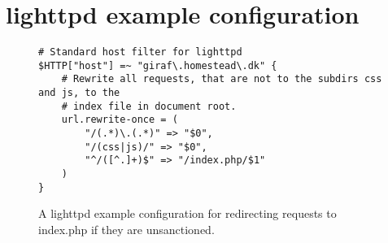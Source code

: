 \chapter{lighttpd example configuration}
\label{appendix_server_conf}
\begin{figure}
\begin{verbatim}
# Standard host filter for lighttpd
$HTTP["host"] =~ "giraf\.homestead\.dk" {
    # Rewrite all requests, that are not to the subdirs css and js, to the
    # index file in document root.
	url.rewrite-once = (
		"/(.*)\.(.*)" => "$0",
		"/(css|js)/" => "$0",
		"^/([^.]+)$" => "/index.php/$1"
	)
}
\end{verbatim}
\caption{A lighttpd example configuration for redirecting requests to index.php if they are unsanctioned.}
\end{figure}
